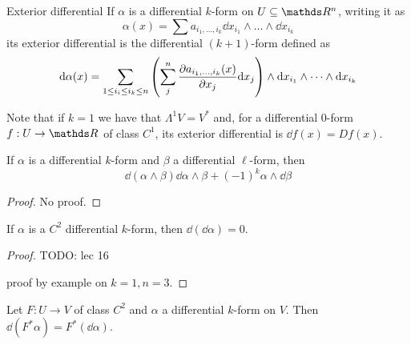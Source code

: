 \documentclass[12pt]{extarticle}
\begin{document}
\begin{definition}{Exterior differential}{}
	If $\alpha$ is a differential $k$-form on $U \subseteq \R^n$, writing it as
	\begin{equation}
		\alpha(x) = \sum a_{i_1, \dots, i_k} \dd x_{i_1} \land \dots \land \dd x_{i_k}
	\end{equation}
	its exterior differential is the differential $(k+1)$-form defined as
	\begin{equation}
		\dd \alpha(x) = \sum_{1 \leq i_i \leq i_k \leq n} \left( \sum_j^n \pdv{a_{i_1, \dots, i_k}(x)}{x_j} \dd x_j \right)
		\land \dd x_{i_1} \land \dots \land \dd x_{i_k}
	\end{equation}
\end{definition}

Note that if $k = 1$ we have that $\Lambda^1 V = V^*$ and, for a differential $0$-form $f: U \to \R$
of class $C^1$, its exterior differential is $\dd f(x) = Df(x)$.

\begin{proposition}{}{}
	If $\alpha$ is a differential $k$-form and $\beta$ a differential $\ell$-form, then
	\begin{equation}
		\dd(\alpha \land \beta) \dd \alpha \land \beta + (-1)^k \alpha \land \dd \beta
	\end{equation}
\end{proposition}

\begin{proof}
	No proof.
\end{proof}

\begin{proposition}{}{}
	If $\alpha$ is a $C^2$ differential $k$-form, then $\dd(\dd \alpha) = 0$.
\end{proposition}
\begin{proof}
	TODO: lec 16

	proof by example on $k=1, n=3$.
\end{proof}

\begin{proposition}{}{}
	Let $F: U \to V$ of class $C^2$ and $\alpha$ a differential $k$-form on $V$.
	Then $\dd(F^* \alpha) = F^*(\dd \alpha)$.
\end{proposition}
\end{document}
